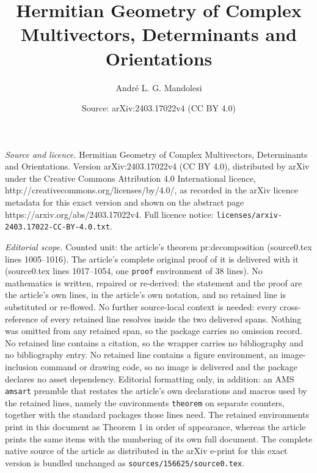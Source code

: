 \documentclass[10pt,a4paper]{amsart}
\title{Hermitian Geometry of Complex Multivectors, Determinants and Orientations}
\author{Andr\'e L. G. Mandolesi}
\date{Source: arXiv:2403.17022v4 (CC BY 4.0)}
\begin{document}
\maketitle

\noindent\emph{Source and licence.} Hermitian Geometry of Complex Multivectors, Determinants and Orientations. Version arXiv:2403.17022v4 (CC BY 4.0), distributed by arXiv under the Creative Commons Attribution 4.0 International licence, http://creativecommons.org/licenses/by/4.0/, as recorded in the arXiv licence metadata for this exact version and shown on the abstract page https://arxiv.org/abs/2403.17022v4. Full licence notice: \texttt{licenses/arxiv-2403.17022-CC-BY-4.0.txt}.\par\smallskip

\noindent\textit{Editorial scope.} Counted unit: the article's theorem pr:decomposition (source0.tex lines 1005--1016). The article's complete original proof of it is delivered with it (source0.tex lines 1017--1054, one \texttt{proof} environment of 38 lines). No mathematics is written, repaired or re-derived: the statement and the proof are the article's own lines, in the article's own notation, and no retained line is substituted or re-flowed.  No further source-local context is needed: every cross-reference of every retained line resolves inside the two delivered spans.  Nothing was omitted from any retained span, so the package carries no omission record.  No retained line contains a citation, so the wrapper carries no bibliography and no bibliography entry.  No retained line contains a figure environment, an image-inclusion command or drawing code, so no image is delivered and the package declares no asset dependency.  Editorial formatting only, in addition: an AMS \texttt{amsart} preamble that restates the article's own declarations and macros used by the retained lines, namely the environments \texttt{theorem} on separate counters, together with the standard packages those lines need.  The retained environments print in this document as Theorem 1 in order of appearance, whereas the article prints the same items with the numbering of its own full document.  The complete native source of the article as distributed in the arXiv e-print for this exact version is bundled unchanged as \texttt{sources/156625/source0.tex}.
\end{document}
